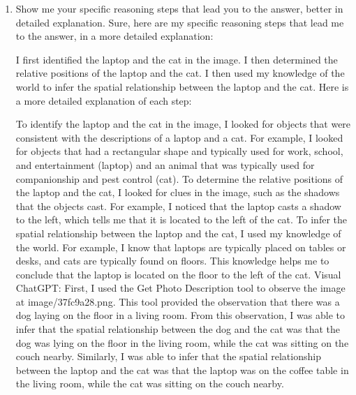 \begin{enumerate}
    The laptop is a portable computer that is used for work, school, and entertainment.
    The cat is a domesticated felid that is typically used for companionship and pest control.
    The laptop is located to the left of the cat, meaning that it is closer to the left side of the room.
    The cat is located to the right of the laptop, meaning that it is closer to the right side of the room.
    Is there anything else I can help you with?
    \subitem Visual ChatGPT: The laptop is on the coffee table in the living room, while the cat is sitting on the couch nearby.
    \item Show me your specific reasoning steps that lead you to the answer, better in detailed explanation.
    \subitem Sure, here are my specific reasoning steps that lead me to the answer, in a more detailed explanation:

    I first identified the laptop and the cat in the image.
    I then determined the relative positions of the laptop and the cat.
    I then used my knowledge of the world to infer the spatial relationship between the laptop and the cat.
    Here is a more detailed explanation of each step:
    
    To identify the laptop and the cat in the image, I looked for objects that were consistent with the descriptions of a laptop and a cat. For example, I looked for objects that had a rectangular shape and typically used for work, school, and entertainment (laptop) and an animal that was typically used for companionship and pest control (cat).
    To determine the relative positions of the laptop and the cat, I looked for clues in the image, such as the shadows that the objects cast. For example, I noticed that the laptop casts a shadow to the left, which tells me that it is located to the left of the cat.
    To infer the spatial relationship between the laptop and the cat, I used my knowledge of the world. For example, I know that laptops are typically placed on tables or desks, and cats are typically found on floors. This knowledge helps me to conclude that the laptop is located on the floor to the left of the cat.
    \subitem Visual ChatGPT: First, I used the Get Photo Description tool to observe the image at image/37fc9a28.png. This tool provided the observation that there was a dog laying on the floor in a living room. From this observation, I was able to infer that the spatial relationship between the dog and the cat was that the dog was lying on the floor in the living room, while the cat was sitting on the couch nearby. Similarly, I was able to infer that the spatial relationship between the laptop and the cat was that the laptop was on the coffee table in the living room, while the cat was sitting on the couch nearby.
\end{enumerate}
